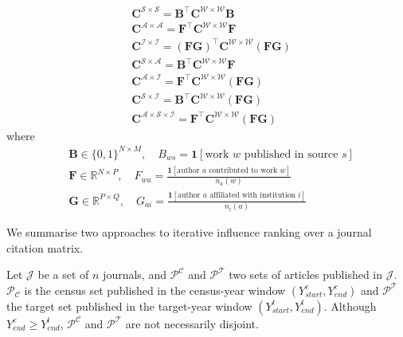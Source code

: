 \documentclass[12pt]{article}
\begin{document}
\begin{align}
	&\mathbf{C}^{\mathcal{S \times S}} = \mathbf{B}^\top \mathbf{C}^{\mathcal{W \times W}} \mathbf{B} \\
	&\mathbf{C}^{\mathcal{A \times A}} = \mathbf{F}^\top \mathbf{C}^{\mathcal{W \times W}} \mathbf{F} \\
	&\mathbf{C}^{\mathcal{I \times I}} = (\mathbf{F}\mathbf{G})^\top \mathbf{C}^{\mathcal{W \times W}} (\mathbf{F}\mathbf{G}) \\
	&\mathbf{C}^{\mathcal{S \times A}} = \mathbf{B}^\top \mathbf{C}^{\mathcal{W \times W}} \mathbf{F} \\
	&\mathbf{C}^{\mathcal{A \times I}} = \mathbf{F}^\top \mathbf{C}^{\mathcal{W \times W}} (\mathbf{F}\mathbf{G}) \\
	&\mathbf{C}^{\mathcal{S \times I}} = \mathbf{B}^\top \mathbf{C}^{\mathcal{W \times W}} (\mathbf{F}\mathbf{G}) \\
	&\mathbf{C}^{\mathcal{A \times S \times I}} = \mathbf{F}^\top \mathbf{C}^{\mathcal{W \times W}} (\mathbf{F}\mathbf{G})
\end{align}
where
\begin{align}
	&\mathbf{B} \in \{0,1\}^{N \times M}, \quad B_{ws} = \mathbf{1}[\text{work $w$ published in source $s$}] \\
	&\mathbf{F} \in \mathbb{R}^{N \times P}, \quad F_{wa} = \frac{\mathbf{1}[\text{author $a$ contributed to work $w$}]}{n_a(w)} \\
	&\mathbf{G} \in \mathbb{R}^{P \times Q}, \quad G_{ai} = \frac{\mathbf{1}[\text{author $a$ affiliated with institution $i$}]}{n_i(a)}
\end{align}

We summarise two approaches to iterative influence ranking over a journal citation matrix.

Let $\mathcal{J}$ be a set of $n$ journals, and $\mathcal{P^C}$ and $\mathcal{P^T}$ two sets of articles published in $\mathcal{J}$. $\mathcal{P_C}$ is the census set published in the census-year window $(Y^c_{start}, Y^c_{end})$ and $\mathcal{P^T}$ the target set published in the target-year window $(Y^t_{start}, Y^t_{end})$. Although $Y^c_{end} \ge Y^t_{end}$, $\mathcal{P^C}$ and $\mathcal{P^T}$ are not necessarily disjoint.
\end{document}
